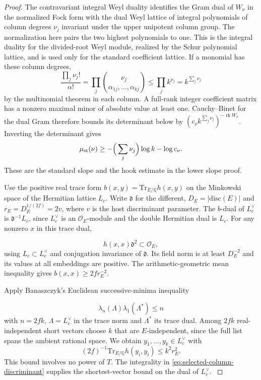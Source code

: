 \begin{proof}
The contravariant integral Weyl duality identifies the Gram
dual of \(W_\nu\) in the normalized Fock form with the
dual Weyl lattice of integral polynomials of column degrees
\(\nu_j\) invariant under the upper unipotent column group.
The normalization here pairs the two highest polynomials to
one. This is the integral duality for the divided-root Weyl
module, realized by the Schur polynomial lattice, and is used
only for the standard coefficient lattice. If a monomial
has these column degrees, 
\[
 \frac{\prod_j\nu_j!}{\alpha!}=\prod_j\binom{\nu_j}{\alpha_{1j},\ldots,\alpha_{kj}}\le\prod_j k^{\nu_j}=k^{\sum_j\nu_j}
\]
 by the multinomial theorem in each column.
A full-rank integer coefficient matrix has a nonzero maximal
minor of absolute value at least one. Cauchy--Binet for the
dual Gram therefore bounds its determinant below by
\((c_\nu k^{\sum_j\nu_j})^{-\operatorname{rk}W_\nu}\).
Inverting the determinant gives
\[
  \mu_{\rm st}(\nu)\ge -\Big(\sum_j\nu_j\Big)\log k-\log c_\nu .
\]
These are the standard slope and the hook estimate in the
lower slope proof. \label{cor:selected-column-metric-3}


Use the positive real trace form \(b(x,y)=\mathrm{Tr}_{E/\mathbb Q}
h(x,y)\) on the Minkowski space of the Hermitian lattice \(L_c\).
Write \(\mathfrak d\) for the different, \(D_E=|\mathrm{disc}(E)|\)
and \(r_E=D_E^{1/(2f)}=2v\), where \(v\) is the host
discriminant parameter. The \(b\)-dual of \(L_c^\vee\) is
\(\mathfrak d^{-1}L_c\), since \(L_c^\vee\) is an
\(\mathcal O_E\)-module and the double Hermitian dual is \(L_c\).
For any nonzero \(x\) in this trace dual,

\[
  h(x,x)\mathfrak d^2\subset\mathcal O_E,
\]
 using
\(L_c\subset L_c^\vee\) and conjugation invariance of
\(\mathfrak d\). Its field norm is at least \(D_E^{-2}\) and
its values at all embeddings are positive. The arithmetic-geometric
mean inequality gives \(b(x,x)\ge2f r_E^{-2}\).

Apply Banaszczyk's Euclidean successive-minima inequality

\[
  \lambda_n(\Lambda)\lambda_1(\Lambda^*)\le n
\]
 with
\(n=2fk\), \(\Lambda=L_c^\vee\) in the trace norm and
\(\Lambda^*\) its trace dual. Among \(2fk\) real-independent
short vectors choose \(k\) that are \(E\)-independent, since
the full list spans the ambient rational space. We obtain
\(y_1,\ldots,y_k\in L_c^\vee\) with
\[
       (2f)^{-1}\mathrm{Tr}_{E/\mathbb Q}h(y_i,y_i)
                   \le k^2 r_E^2 .
\]
This bound involves no power of \(T\). The integrality
in \eqref{eq:selected-column-discriminant} supplies the
shortest-vector bound on the dual of \(L_c^\vee\).
\cite{banaszczyk}\label{cor:selected-column-metric-4}


\end{proof}
